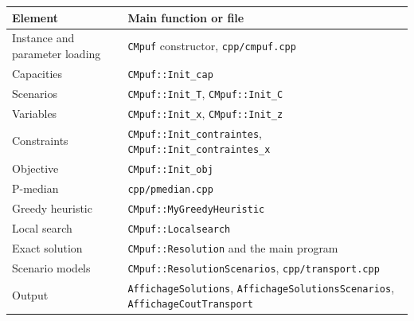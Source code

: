 \documentclass[11pt,a4paper]{article}
\newcommand{\code}[1]{\texttt{#1}}
\begin{document}
\begin{longtable}{p{5.2cm}p{9cm}}
\toprule
Element&Main function or file\\ \midrule \endhead
Instance and parameter loading&\code{CMpuf} constructor,
\code{cpp/cmpuf.cpp}\\
Capacities&\code{CMpuf::Init\_cap}\\
Scenarios&\code{CMpuf::Init\_T}, \code{CMpuf::Init\_C}\\
Variables&\code{CMpuf::Init\_x}, \code{CMpuf::Init\_z}\\
Constraints&\code{CMpuf::Init\_contraintes},
\code{CMpuf::Init\_contraintes\_x}\\
Objective&\code{CMpuf::Init\_obj}\\
P-median&\code{cpp/pmedian.cpp}\\
Greedy heuristic&\code{CMpuf::MyGreedyHeuristic}\\
Local search&\code{CMpuf::Localsearch}\\
Exact solution&\code{CMpuf::Resolution} and the main program\\
Scenario models&\code{CMpuf::ResolutionScenarios},
\code{cpp/transport.cpp}\\
Output&\code{AffichageSolutions}, \code{AffichageSolutionsScenarios},
\code{AffichageCoutTransport}\\ \bottomrule
\end{longtable}
\end{document}
